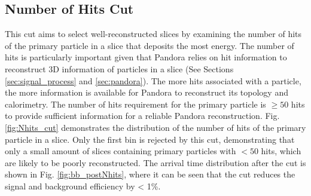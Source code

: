 \subsection{Number of Hits Cut}
\label{sec:hit_cut}

This cut aims to select well-reconstructed slices by examining the number of hits of the primary particle in a slice that deposits the most energy.
The number of hits is particularly important given that Pandora relies on hit information to reconstruct 3D information of particles in a slice (See Sections \ref{sec:signal_process} and \ref{sec:pandora}).
The more hits associated with a particle, the more information is available for Pandora to reconstruct its topology and calorimetry.
The number of hits requirement for the primary particle is $\geq 50$ hits to provide sufficient information for a reliable Pandora reconstruction.
Fig. \ref{fig:Nhits_cut} demonstrates the distribution of the number of hits of the primary particle in a slice. 
Only the first bin is rejected by this cut, demonstrating that only a small amount of slices containing primary particles with $< 50$ hits, which are likely to be poorly reconstructed.
The arrival time distribution after the cut is shown in Fig. \ref{fig:bb_postNhits}, where it can be seen that the cut reduces the signal and background efficiency by < 1\%.


